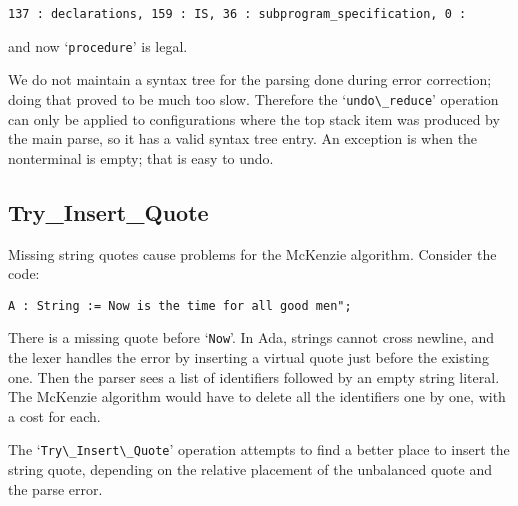 \documentclass{article}
\newcommand{\code}[1]{`\lstinline|#1|'}
\begin{document}
\begin{verbatim}
137 : declarations, 159 : IS, 36 : subprogram_specification, 0 :
\end{verbatim}
and now \code{procedure} is legal.

We do not maintain a syntax tree for the parsing done during error
correction; doing that proved to be much too slow. Therefore the
\code{undo\_reduce} operation can only be applied to configurations
where the top stack item was produced by the main parse, so it has a
valid syntax tree entry. An exception is when the nonterminal is
empty; that is easy to undo.

\subsection{Try\_Insert\_Quote}
Missing string quotes cause problems for the McKenzie algorithm.
Consider the code:
\begin{lstlisting}
A : String := Now is the time for all good men";
\end{lstlisting}
There is a missing quote before \code{Now}. In Ada, strings cannot
cross newline, and the lexer handles the error by inserting a virtual
quote just before the existing one. Then the parser sees a list of
identifiers followed by an empty string literal. The McKenzie
algorithm would have to delete all the identifiers one by one, with a
cost for each.

The \code{Try\_Insert\_Quote} operation attempts to find a better
place to insert the string quote, depending on the relative placement
of the unbalanced quote and the parse error.
\end{document}
